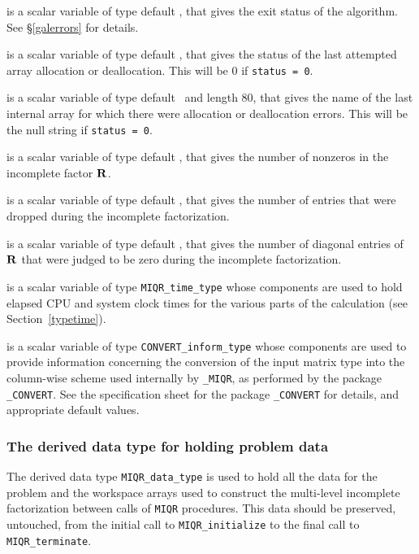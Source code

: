 \documentclass{galahad}
\newcommand{\packagename}{MIQR}
\newcommand{\fullpackagename}{\libraryname\_\packagename}
\begin{document}
\begin{description}

 is a scalar variable of type default \integer, that gives the
exit status of the algorithm.
See \S\ref{galerrors}
for details.

 is a scalar variable of type default \integer, that gives
the status of the last attempted array allocation or deallocation.
This will be 0 if {\tt status = 0}.

 is a scalar variable of type default \character\
and length 80, that  gives the name of the last internal array
for which there were allocation or deallocation errors.
This will be the null string if {\tt status = 0}.

 is a scalar variable of type default \integer, that
gives the number of nonzeros in the incomplete factor ${\mathbf{R}}$.

 is a scalar variable of type default \integer, that
gives the number of entries that were dropped during the incomplete
factorization.

 is a scalar variable of type default \integer, that
gives the number of diagonal entries of ${\mathbf{R}}$ that were judged to be zero
during the incomplete factorization.

 is a scalar variable of type {\tt \packagename\_time\_type}
whose components are used to hold elapsed CPU and system clock times for
the various parts of the calculation (see Section~\ref{typetime}).

 is a scalar variable of type
{\tt CONVERT\_inform\_type}
whose components are used to provide information concerning
the conversion of the input matrix type into the column-wise scheme
used internally by  {\tt \fullpackagename}, as performed by the package
{\tt \libraryname\_CONVERT}.
See the specification sheet for the package
{\tt \libraryname\_CONVERT}
for details, and appropriate default values.

\end{description}


\subsubsection{The derived data type for holding problem data}\label{typedata}
The derived data type
{\tt \packagename\_data\_type}
is used to hold all the data for the problem and the workspace arrays
used to construct the multi-level incomplete factorization between calls of
{\tt \packagename} procedures.
This data should be preserved, untouched, from the initial call to
{\tt \packagename\_initialize}
to the final call to
{\tt \packagename\_terminate}.
\end{document}
